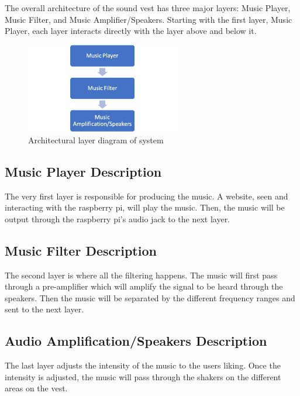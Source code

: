The overall architecture of the sound vest has three major layers: Music Player, Music Filter, and Music Amplifier/Speakers. Starting with the first layer, Music Player, each layer interacts directly with the layer above and below it.
\begin{figure}[h!]
	\centering
 	\includegraphics[width=0.60\textwidth]{images/layers}
 \caption{Architectural layer diagram of system}
\end{figure}

\subsection{Music Player Description}
The very first layer is responsible for producing the music. A website, seen and interacting with the raspberry pi, will play the music. Then, the music will be output through the raspberry pi's audio jack to the next layer. 

\subsection{Music Filter Description}
The second layer is where all the filtering happens. The music will first pass through a pre-amplifier which will amplify the signal to be heard through the speakers. Then the music will be separated by the different frequency ranges and sent to the next layer. 

\subsection{Audio Amplification/Speakers Description}
The last layer adjusts the intensity of the music to the users liking. Once the intensity is adjusted, the music will pass through the shakers on the different areas on the vest. 